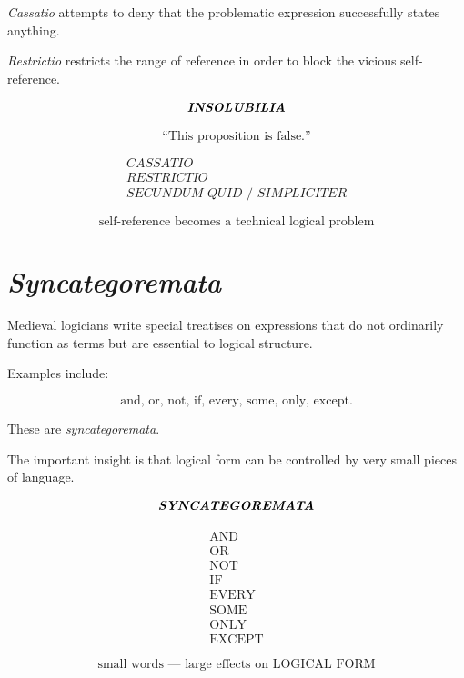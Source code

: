 \documentclass[11pt]{article}
\newcommand{\latin}[1]{\textit{#1}}
\begin{document}
\latin{Cassatio} attempts to deny that the problematic expression
successfully states anything.

\latin{Restrictio} restricts the range of reference in order to
block the vicious self-reference.

\begin{whiteboard}
\[
\textbf{\latin{INSOLUBILIA}}
\]

\[
\text{``This proposition is false.''}
\]

\[
\begin{array}{c}
\latin{CASSATIO}\\
\latin{RESTRICTIO}\\
\latin{SECUNDUM\ QUID\ /\ SIMPLICITER}
\end{array}
\]

\[
\boxed{\text{self-reference becomes a technical logical problem}}
\]
\end{whiteboard}

\section{\textit{Syncategoremata}}

Medieval logicians write special treatises on expressions that do
not ordinarily function as terms but are essential to logical
structure.

Examples include:

\[
\text{and,\ or,\ not,\ if,\ every,\ some,\ only,\ except.}
\]

These are \latin{syncategoremata}.

The important insight is that logical form can be controlled by
very small pieces of language.

\begin{whiteboard}
\[
\textbf{\latin{SYNCATEGOREMATA}}
\]

\[
\begin{array}{c}
\text{AND}\\
\text{OR}\\
\text{NOT}\\
\text{IF}\\
\text{EVERY}\\
\text{SOME}\\
\text{ONLY}\\
\text{EXCEPT}
\end{array}
\]

\[
\boxed{\text{small words --- large effects on LOGICAL FORM}}
\]
\end{whiteboard}
\end{document}
